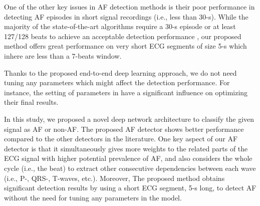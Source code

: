 \documentclass[conference]{IEEEtran}
\begin{document}
One of the other key issues in AF detection methods is their poor performance in detecting AF episodes in short signal recordings (i.e., less than 30-s).
 While the majority of the state-of-the-art algorithms require a 30-s episode or at least 127/128 beats to achieve an acceptable detection performance \cite{cui2017automated,zhou2014automatic,huang2011novel,lee2013time}, our proposed method offers great performance on very short ECG segments of size 5-s which inhere are less than a 7-beats window. 

Thanks to the proposed end-to-end deep learning approach, we do not need tuning any parameters which might affect the detection performance. For instance, the setting of parameters in \cite{cui2017automated,petrenas2015low} have a significant influence on optimizing their final results. 

In this study, we proposed a novel deep network architecture to classify the given signal as AF or non-AF. The proposed AF detector shows better performance compared to the other detectors in the literature. One key aspect of our AF detector is that it simultaneously gives more weights to the related parts of the ECG signal with higher potential prevalence of AF, and also considers the whole cycle (i.e., the beat) to extract other consecutive dependencies between each wave (i.e., P-, QRS-, T-waves, etc.). Moreover, The proposed method obtains significant detection results by using a short ECG segment, 5-s long, to detect AF without the need for tuning any parameters in the model. 











\end{document}
